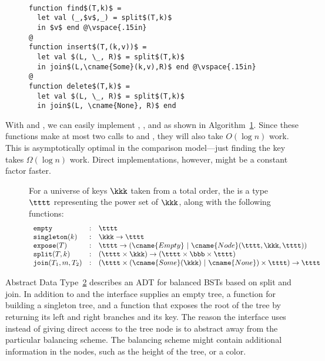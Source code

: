 \begin{figure}
\begin{algorithm}~
\label{alg:searchInsertDelete}
\begin{lstlisting}[numbers=none]
function find$(T,k)$ =
  let val (_,$v$,_) = split$(T,k)$
  in $v$ end @\vspace{.15in}
@
function insert$(T,(k,v))$ =
  let val $(L, \_, R)$ = split$(T,k)$
  in join$(L,\cname{Some}(k,v),R)$ end @\vspace{.15in}
@
function delete$(T,k)$ =
  let val $(L, \_, R)$ = split$(T,k)$
  in join$(L, \cname{None}, R)$ end
\end{lstlisting}
\end{algorithm}
\end{figure}

With  and , we can easily implement
, , and  as shown in
Algorithm~\ref{alg:searchInsertDelete}.  Since these functions make at
most two calls to  and , they will also take
$O(\log n)$ work.  This is asymptotically optimal in the comparison
model---just finding the key takes $\Omega(\log n)$ work.  
Direct implementations, however, might be a constant factor faster.

\newcommand{\bstt}{\tttt}
\begin{figure}
\begin{datatype}[\bf BST]
\label{adt:bbst}
\normalsize For a universe of keys $\kkk$ taken from a total order,
the  is a type $\bstt$ representing the power set
of $\kkk$, along with the following functions:
\[
\begin{array}{lclcl}
\texttt{empty}
& : &\bstt
\\
\texttt{singleton}(k) 
& : & \kkk \rightarrow \bstt
\\
\texttt{expose}(T) 
& : & \bstt \rightarrow (\cname{Empty}~|~\cname{Node}(\bstt,\kkk,\bstt))
\\
\texttt{split}(T,k) 
& : & (\bstt \times \kkk) \rightarrow (\bstt \times \bbb \times \bstt)
\\
\texttt{join}(T_1,m,T_2) 
& : & (\bstt \times (\cname{Some}(\kkk)~|~\cname{None}) \times \bstt) \rightarrow \bstt 
\\
\end{array}
\]
\end{datatype}
\end{figure}

Abstract Data Type~\ref{adt:bbst} describes an ADT for balanced BSTs
based on split and join.  In addition to  and
 the interface supplies an empty tree, a function for
building a singleton tree, and a function  that exposes
the root of the tree by returning its left and right branches and its
key.  The reason the interface uses  instead of giving
direct access to the tree node is to abstract away from the particular
balancing scheme.  The balancing scheme might contain additional
information in the nodes, such as the height of the tree, or a color.

